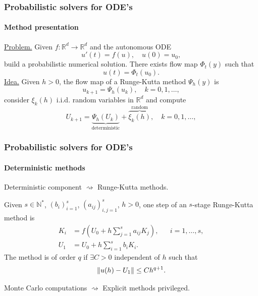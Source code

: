 \documentclass{beamer}
\newcommand{\N}{\mathbb{N}}
\newcommand{\R}{\mathbb{R}}
\newcommand{\sksum}{\textstyle\sum}
\begin{document}
\begin{frame}
	\frametitle{Probabilistic solvers for ODE's}
	\framesubtitle{Method presentation \cite{CGS16}}
	
	\underline{Problem.} Given $f\colon\R^d\to\R^d$ and the autonomous ODE 
	\begin{equation*}
		u'(t) = f(u), \quad	u(0) = u_0, 
	\end{equation*}
	build a probabilistic numerical solution. There exists flow map $\Phi_t(y)$ such that
	\begin{equation*}
		u(t) = \Phi_t(u_0).
	\end{equation*}
	\underline{Idea.} Given $h > 0$, the flow map of a Runge-Kutta method $\Psi_h(y)$ is
	\begin{equation*}
		u_{k+1} = \Psi_h(u_k), \quad k = 0, 1, \ldots,
	\end{equation*}
	consider $\xi_k(h)$ i.i.d. random variables in $\R^d$ and compute
	\begin{equation*}
		U_{k+1} = \underbrace{\Psi_h(U_k)}_{\text{deterministic}} + \overbrace{\xi_k(h)}^{\text{random}}, \quad k = 0, 1, \ldots,
	\end{equation*}
	
\end{frame}

\begin{frame}
	\frametitle{Probabilistic solvers for ODE's}
	\framesubtitle{Deterministic methods \cite{HLW02}}
	
	Deterministic component $\rightsquigarrow$ Runge-Kutta methods.
	\begin{definition} Given $s \in \N^*$, $(b_i)_{i=1}^s$, $(a_{ij})_{i,j=1}^s$, $h > 0$, one step of an $s$-stage Runge-Kutta method is 
		\begin{equation*}
		\begin{aligned}
		K_i &= f(U_0 + h\sksum_{j=1}^s a_{ij}K_j), && i = 1, \ldots, s, \\
		U_1 &= U_0 + h \sksum_{i=1}^s b_i K_i.
		\end{aligned}
		\end{equation*}
		The method is of order $q$ if $\exists C > 0$ independent of $h$ such that
		\begin{equation*}
			\norm{u(h)-U_1} \leq Ch^{q+1}.
		\end{equation*}
	\end{definition}
	Monte Carlo computations $\rightsquigarrow$ Explicit methods privileged.
	
\end{frame}
\end{document}
